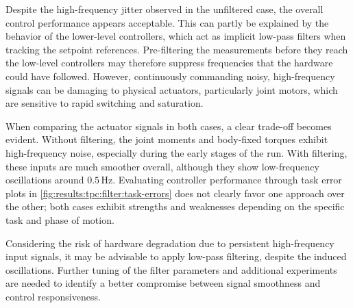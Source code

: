 Despite the high-frequency jitter observed in the unfiltered case, the overall control performance appears acceptable. This can partly be explained by the behavior of the lower-level controllers, which act as implicit low-pass filters when tracking the setpoint references. Pre-filtering the measurements before they reach the low-level controllers may therefore suppress frequencies that the hardware could have followed. However, continuously commanding noisy, high-frequency signals can be damaging to physical actuators, particularly joint motors, which are sensitive to rapid switching and saturation.

When comparing the actuator signals in both cases, a clear trade-off becomes evident. Without filtering, the joint moments and body-fixed torques exhibit high-frequency noise, especially during the early stages of the run. With filtering, these inputs are much smoother overall, although they show low-frequency oscillations around \(0.5\,\mathrm{Hz}\). Evaluating controller performance through task error plots in \autoref{fig:results:tpc:filter:task-errors} does not clearly favor one approach over the other; both cases exhibit strengths and weaknesses depending on the specific task and phase of motion.

Considering the risk of hardware degradation due to persistent high-frequency input signals, it may be advisable to apply low-pass filtering, despite the induced oscillations. Further tuning of the filter parameters and additional experiments are needed to identify a better compromise between signal smoothness and control responsiveness.






